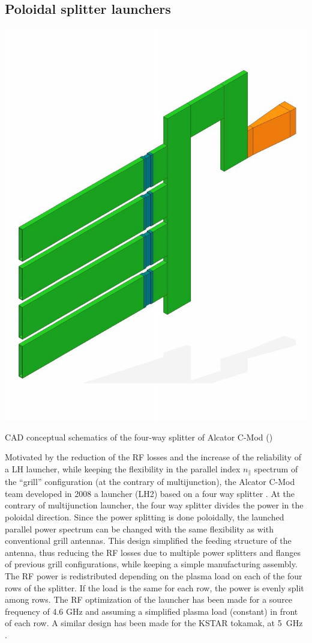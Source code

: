 \subsection{Poloidal splitter launchers}
\begin{marginfigure}
	\centering
	\includegraphics[width=0.8\linewidth]{figures/chap3/FourWaySplitter_1module}
	\caption{CAD conceptual schematics of the four-way splitter of Alcator C-Mod ()}
	\label{fig:fourwaysplitter1module}
\end{marginfigure}

Motivated by the reduction of the RF losses and the increase of the reliability of a LH launcher, while keeping the flexibility in the parallel index $n_{\parallel}$ spectrum of the “grill” configuration (at the contrary of multijunction), the Alcator C-Mod team developed in 2008 a launcher (LH2) based on a four way splitter . At the contrary of multijunction launcher, the four way splitter divides the power in the poloidal direction. Since the power splitting is done poloidally, the launched parallel power spectrum can be changed with the same flexibility as with conventional grill antennas. This design simplified the feeding structure of the antenna, thus reducing the RF losses due to multiple power splitters and flanges of previous grill configurations, while keeping a simple manufacturing assembly. The RF power is redistributed depending on the plasma load on each of the four rows of the splitter. If the load is the same for each row, the power is evenly split among rows. The RF optimization of the launcher has been made for a source frequency of 4.6 GHz and assuming a simplified plasma load (constant) in front of each row. A similar design has been made for the KSTAR tokamak, at 5~GHz . 


